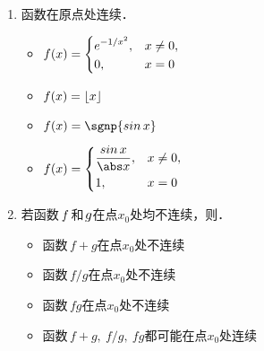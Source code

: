 \documentclass[a4paper,punct=CCT]{ctexbook}
\theoremstyle{definition}
\theoremstyle{remark}
\newif\ifshowsol
\begin{document}
\begin{enumerate}
\item 函数\uline{\makebox[10em]{}}在原点处连续．
  \begin{itemize}
    \renewcommand{\labelitemi}{\faCircleThin}
    \ifshowsol
  \item[\faCircle]
    \else
  \item
    \fi
    \begin{math}
      f(x) =
      \begin{dcases}
        e^{-1/x^2}, & x \ne 0, \\
        0, & x = 0
      \end{dcases}
    \end{math}
  \item \(f(x) = \lfloor x\rfloor\)
  \item \(f(x) = \sgnp{\sin x}\)
  \item
    \begin{math}
      f(x) =
      \begin{dcases}
        \frac{\sin x}{\abs x}, & x \ne 0, \\
        1, & x = 0
      \end{dcases}
    \end{math}\rule{0ex}{5ex}
  \end{itemize}

  \ifshowsol
  原点是选项~B、C、D中函数的跳跃间断点．选项~A中的函数在原点处的左右极限都是\(0\)且等于此处的函数值，因此连续．
  \fi

\item 若函数\(\,f\mkern2mu\)和\(\mkern2mu g\)在点\(x_0\)处均不连续，则\uline{\makebox[10em]{}}．
  \begin{itemize}
    \renewcommand{\labelitemi}{\faCircleThin}
  \item 函数\(\,f+g\)在点\(x_0\)处不连续
  \item 函数\(\,f/g\)在点\(x_0\)处不连续
  \item 函数\(\,fg\)在点\(x_0\)处不连续
    \ifshowsol
  \item[\faCircle]
    \else
  \item
    \fi
    函数\(\,f+g,\ f/g,\ fg\)都可能在点\(x_0\)处连续
  \end{itemize}

  \ifshowsol
  令\(\,f(x) = \Fn H(x),\ g(x) = 1-\Fn H(x)\)，则\(\,f + g = 1,\ fg = 0\)，因此选项~A和~C不正确．令
  \begin{equation*}
    f(x) = g(x) = \frac{1}{x \Fn H(x) + \Fn H(-x)},
  \end{equation*}
  则\(\,f/g = 1\)，因此选项~B不正确．
  \fi
\end{enumerate}
\fi
\end{document}
